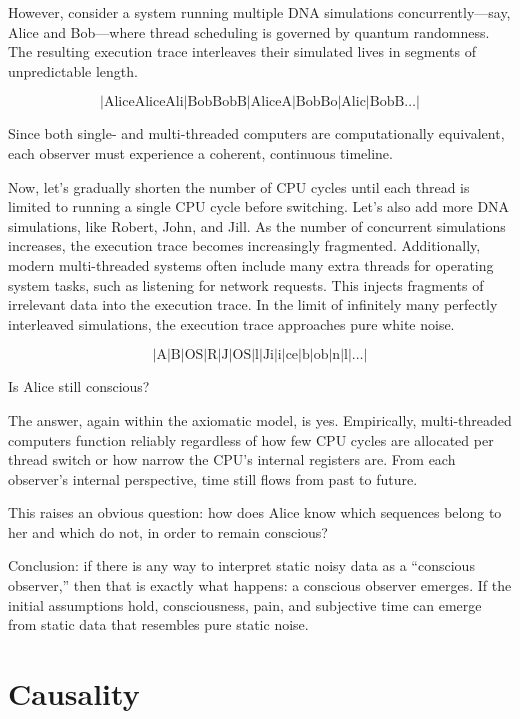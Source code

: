 However, consider a system running multiple DNA simulations concurrently---say, Alice and Bob---where thread scheduling is governed by quantum randomness. The resulting execution trace interleaves their simulated lives in segments of unpredictable length.

\[
|\text{AliceAliceAli}|\text{BobBobB}|\text{AliceA}|\text{BobBo}|\text{Alic}|\text{BobB}\dots|
\]

Since both single- and multi-threaded computers are computationally equivalent, each observer must experience a coherent, continuous timeline.

Now, let's gradually shorten the number of CPU cycles until each thread is limited to running a single CPU cycle before switching. Let's also add more DNA simulations, like Robert, John, and Jill. As the number of concurrent simulations increases, the execution trace becomes increasingly fragmented. Additionally, modern multi-threaded systems often include many extra threads for operating system tasks, such as listening for network requests. This injects fragments of irrelevant data into the execution trace. In the limit of infinitely many perfectly interleaved simulations, the execution trace approaches pure white noise.

\[
|\text{A}| \text{B}| \text{OS}| \text{R}| \text{J}| \text{OS}| \text{l}| \text{Ji}| \text{i}| \text{ce}| \text{b}| \text{ob}| \text{n}| \text{l}| \dots|
\]

Is Alice still conscious?

The answer, again within the axiomatic model, is yes. Empirically, multi-threaded computers function reliably regardless of how few CPU cycles are allocated per thread switch or how narrow the CPU’s internal registers are. From each observer's internal perspective, time still flows from past to future.

This raises an obvious question: how does Alice know which sequences belong to her and which do not, in order to remain conscious?

Conclusion: if there is any way to interpret static noisy data as a ``conscious observer,'' then that is exactly what happens: a conscious observer emerges. If the initial assumptions hold, consciousness, pain, and subjective time can emerge from static data that resembles pure static noise.


\section{Causality}

